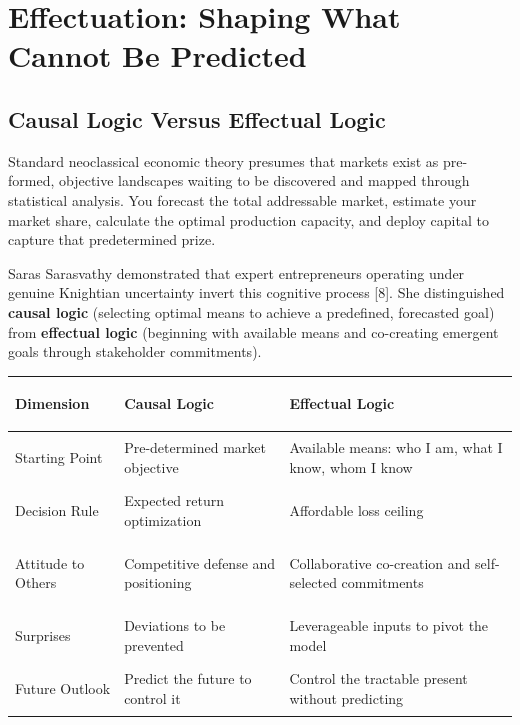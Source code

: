 \section{Effectuation: Shaping What Cannot Be Predicted}

\subsection{Causal Logic Versus Effectual Logic}

Standard neoclassical economic theory presumes that markets exist as pre-formed, objective landscapes waiting to be discovered and mapped through statistical analysis. You forecast the total addressable market, estimate your market share, calculate the optimal production capacity, and deploy capital to capture that predetermined prize.

Saras Sarasvathy demonstrated that expert entrepreneurs operating under genuine Knightian uncertainty invert this cognitive process [8]. She distinguished \textbf{causal logic} (selecting optimal means to achieve a predefined, forecasted goal) from \textbf{effectual logic} (beginning with available means and co-creating emergent goals through stakeholder commitments).

\begin{tcolorbox}[
  enhanced,
  colback=BayesSurface!60,
  colframe=BayesBorder,
  boxrule=0.5pt,
  arc=3pt,
  left=3pt,right=3pt,top=3pt,bottom=3pt,
  boxsep=1pt
]
\scriptsize
\begin{tabularx}{\linewidth}{>{\bfseries\raggedright\arraybackslash}p{2.3cm} X X}
\toprule
\textbf{Dimension} & \textbf{Causal Logic} & \textbf{Effectual Logic} \\
\midrule
Starting Point & Pre-determined market objective & Available means: who I am, what I know, whom I know \\
\addlinespace[2pt]
Decision Rule & Expected return optimization & Affordable loss ceiling \\
\addlinespace[2pt]
Attitude to Others & Competitive defense and positioning & Collaborative co-creation and self-selected commitments \\
\addlinespace[2pt]
Surprises & Deviations to be prevented & Leverageable inputs to pivot the model \\
\addlinespace[2pt]
Future Outlook & Predict the future to control it & Control the tractable present without predicting \\
\bottomrule
\end{tabularx}
\end{tcolorbox}

